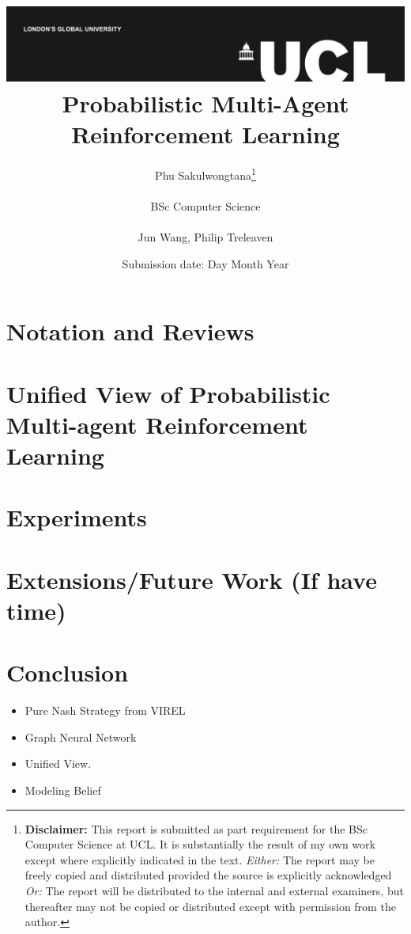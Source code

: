 \documentclass{report}
\title{{\vspace{-14em} \includegraphics[scale=0.4]{ucl_logo.png}}\\
{{\Huge Probabilistic Multi-Agent Reinforcement Learning}}\\
}
\date{Submission date: Day Month Year}
\author{Phu Sakulwongtana\thanks{
{\bf Disclaimer:}
This report is submitted as part requirement for the BSc Computer Science at UCL. It is
substantially the result of my own work except where explicitly indicated in the text.
\emph{Either:} The report may be freely copied and distributed provided the source is explicitly acknowledged
\newline  %
\emph{Or:}\newline
The report will be distributed to the internal and external examiners, but thereafter may not be copied or distributed except with permission from the author.}
\\ \\
BSc Computer Science\\ \\
Jun Wang, Philip Treleaven}
\begin{document}
 
\onehalfspacing
\maketitle
\begin{abstract}

\end{abstract}

\tableofcontents
\setcounter{page}{1}

\chapter{Notation and Reviews}


\chapter{Unified View of Probabilistic Multi-agent Reinforcement Learning}


\chapter{Experiments}

\chapter{Extensions/Future Work (If have time)}


\chapter{Conclusion}
\begin{itemize}
    \item Pure Nash Strategy from VIREL
    \item Graph Neural Network 
    \item Unified View. 
    \item Modeling Belief 
\end{itemize}





% 

% 

% 
\end{document}
